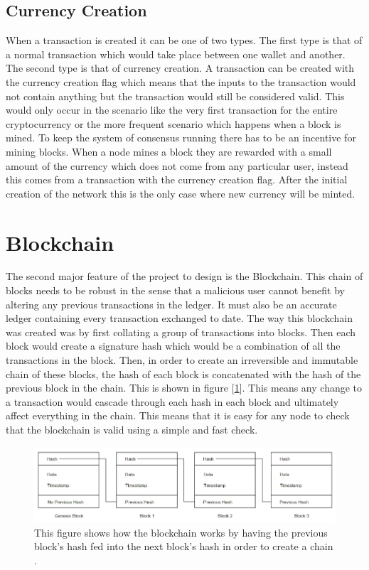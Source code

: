 \documentclass{l4proj}
\begin{document}
\subsection{Currency Creation}
When a transaction is created it can be one of two types. The first type is that of a normal transaction which would take place
between one wallet and another. The second type is that of currency creation. A transaction can be created with the 
currency creation flag which means that the inputs to the transaction would not contain anything but the transaction
would still be considered valid. This would only occur in the scenario like the very first transaction for the entire
cryptocurrency or the more frequent scenario which happens when a block is mined. To keep the system of consensus 
running there has to be an incentive for mining blocks. When a node mines a block they are rewarded with a small
amount of the currency which does not come from any particular user, instead this comes from a transaction with the
currency creation flag. After the initial creation of the network this is the only case where new currency will be
minted.

\section{Blockchain}
The second major feature of the project to design is the Blockchain. This chain of blocks needs to be robust in
the sense that a malicious user cannot benefit by altering any previous transactions in the ledger. It must
also be an accurate ledger containing every transaction exchanged to date. The way this blockchain was created was
by first collating a group of transactions into blocks. Then each block would create a signature hash which would
be a combination of all the transactions in the block. Then, in order to create an irreversible and immutable chain
of these blocks, the hash of each block is concatenated with the hash of the previous block in the chain. This is
shown in figure [\ref{fig:blockchainDiagram}]. This means
any change to a transaction would cascade through each hash in each block and ultimately affect everything in the
chain. This means that it is easy for any node to check that the blockchain is valid using a simple and fast check.

\begin{figure}[!ht]
    \centering
    \includegraphics[width=1\linewidth]{images/blockchaindiagram.png}    

    \caption{
        This figure shows how the blockchain works by having the previous block's hash fed into the next
        block's hash in order to create a chain \citep{blockchainimage}.
    }
    \label{fig:blockchainDiagram} 
\end{figure}
\end{document}
